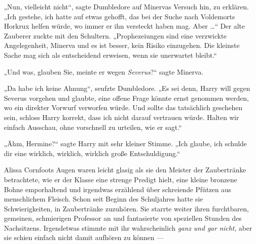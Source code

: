 „Nun, vielleicht nicht“, sagte Dumbledore auf Minervas Versuch hin, zu erklären.
„Ich gestehe, ich hatte auf etwas gehofft, das bei der Suche nach Voldemorts Horkrux helfen würde, wo immer er ihn versteckt haben mag. Aber …“ Der alte Zauberer zuckte mit den Schultern.
„Prophezeiungen sind eine verzwickte Angelegenheit, Minerva und es ist besser, kein Risiko einzugehen. Die kleinste Sache mag sich als entscheidend erweisen, wenn sie unerwartet bleibt.“

„Und was, glauben Sie, meinte er wegen \emph{Severus}?“ sagte Minerva.

„Da habe ich keine Ahnung“, seufzte Dumbledore.
„Es sei denn, Harry will gegen Severus vorgehen und glaubte, eine offene Frage könnte ernst genommen werden, wo ein direkter Vorwurf verworfen würde. Und sollte das tatsächlich geschehen sein, schloss Harry korrekt, dass ich nicht darauf vertrauen würde. Halten wir einfach Ausschau, ohne vorschnell zu urteilen, wie er sagt.“


„Ähm, Hermine?“ sagte Harry mit sehr kleiner Stimme.
„Ich glaube, ich schulde dir eine wirklich, wirklich, wirklich große Entschuldigung.“


Alissa Cornfoots Augen waren leicht glasig als sie den Meister der Zaubertränke betrachtete, wie er der Klasse eine strenge Predigt hielt, eine kleine bronzene Bohne emporhaltend und irgendwas erzählend über schreiende Pfützen aus menschlichem Fleisch. Schon seit Beginn des Schuljahres hatte sie Schwierigkeiten, in Zaubertränke zuzuhören. Sie starrte weiter ihren furchtbaren, gemeinen, schmierigen Professor an und fantasierte von speziellen Stunden des Nachsitzens. Irgendetwas stimmte mit ihr wahrscheinlich \emph{ganz und gar nicht,} aber sie schien einfach nicht damit aufhören zu können —

